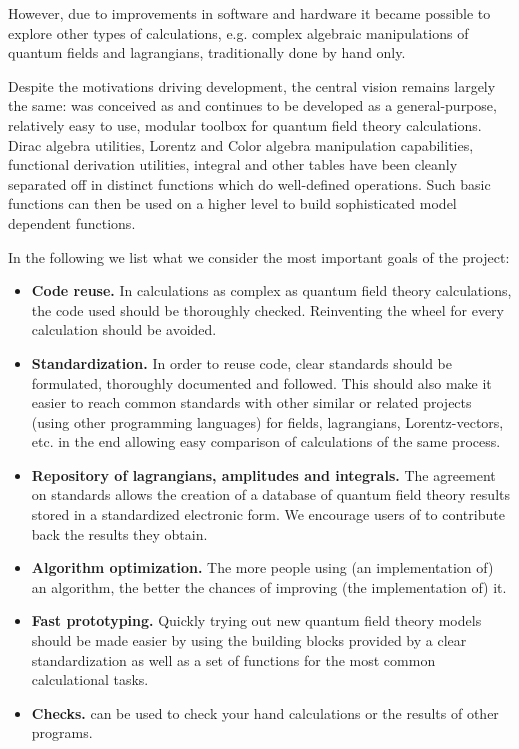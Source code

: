 However, due to improvements in software and hardware it became possible
to explore other types of calculations, e.g. complex algebraic manipulations of quantum fields
and lagrangians, traditionally done by hand only.

Despite the motivations driving development, the central vision remains largely the same: 
\fc was conceived as and continues to be developed as a general-purpose, relatively easy to use,
modular toolbox for quantum field theory calculations. 
Dirac algebra utilities, Lorentz and Color algebra manipulation capabilities, 
functional derivation utilities, integral and other tables have been cleanly 
separated off in distinct functions which 
do well-defined operations.  
Such basic functions can then be used  on a higher level to build sophisticated model dependent functions.

In the following we list what we consider the most important goals of the \fc project:

\begin{itemize}

\item{{\bf Code reuse.} In calculations as complex as quantum field theory calculations,
the code used should be thoroughly checked. Reinventing the wheel for every calculation should be avoided.}

\item{{\bf Standardization.} In order to reuse code, clear standards should be formulated, thoroughly documented and followed. This should also make it easier to reach common standards with other similar or related projects (using other programming languages) for fields, lagrangians, Lorentz-vectors, etc. in the end allowing easy comparison of calculations of the same process.}

\item{{\bf Repository of lagrangians, amplitudes and integrals.} The agreement on standards allows the creation of a database of quantum field theory results stored in a standardized electronic form. We encourage users of \fc to contribute back the results they obtain.}

\item{{\bf Algorithm optimization.} The more people using (an implementation of) an algorithm, the better the chances of improving (the implementation of) it.}

\item{{\bf Fast prototyping.} Quickly trying out new quantum field theory models should be made easier by using the building blocks provided by a clear standardization as well as a set of functions for the most common calculational tasks.}

\item{{\bf Checks.} \fc can be used to check your hand calculations or the results of other programs.}

\end{itemize}

